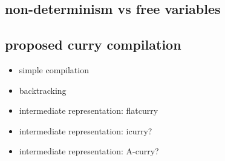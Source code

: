 \subsection{non-determinism vs free variables}
\subsection{proposed curry compilation}
\begin{itemize}
  \item simple compilation
  \item backtracking
  \item intermediate representation: flatcurry
  \item intermediate representation: icurry?
  \item intermediate representation: A-curry?
\end{itemize}
